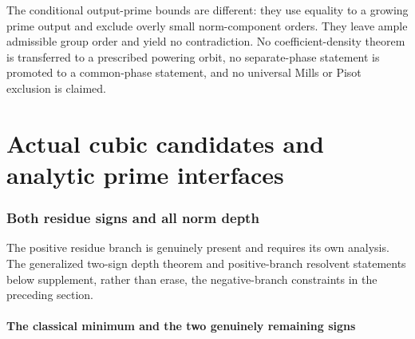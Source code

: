\documentclass[11pt,a4paper]{article}
\theoremstyle{definition}\newtheorem{definition}[theorem]{Definition}
\theoremstyle{remark}\newtheorem{remark}[theorem]{Remark}
\begin{document}
The conditional output-prime bounds are different: they use equality to a
growing prime output and exclude overly small norm-component orders.
They leave ample admissible group order and yield no contradiction.
No coefficient-density theorem is transferred to a prescribed powering
orbit, no separate-phase statement is promoted to a common-phase
statement, and no universal Mills or Pisot exclusion is claimed.




\endgroup

\clearpage\part{Actual cubic candidates and analytic prime interfaces}

\section{Both residue signs and all norm depth}\label{src:R17}
The positive residue branch is genuinely present and requires its own analysis. The generalized two-sign depth theorem and positive-branch resolvent statements below supplement, rather than erase, the negative-branch constraints in the preceding section.
\medskip
\begingroup




\subsection{The classical minimum and the two genuinely remaining signs}
\end{document}
